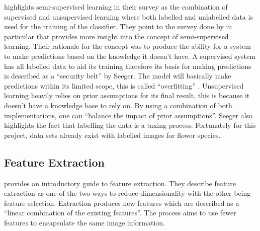 \documentclass[12pt,a4paper]{report}
\begin{document}
\par

\citet{zhu2005semi} highlights semi-supervised learning in their survey as the combination of supervised and
unsupervised 
learning where both labelled and unlabelled data is used for the training of the classifier. They point to the survey done by
\citet{seeger2000learning} in particular that provides more insight into the concept of semi-supervised 
learning. Their rationale for the concept was to produce the ability for a system to make predictions based on 
the knowledge it doesn't have. A supervised system has all labelled data to aid its training therefore its basis for making
predictions is described as a “security belt” by Seeger. The model will basically make predictions within its limited 
scope, this is called “overfitting” \citep{tom1995}. Unsupervised learning heavily relies on prior assumptions for 
its final result, this is because it doesn't have a knowledge base to rely on. By using a combination of both 
implementations, one can “balance the impact of prior assumptions”. Seeger also highlights the fact that labelling the 
data is a taxing process. Fortunately for this project, data sets already exist with labelled images for 
flower species.

\subsection{Feature Extraction}

\citet{dishaa2021} provides an introductory guide to feature extraction. They describe feature extraction 
as one of the two ways to reduce dimensionality with the other being feature selection. Extraction produces new 
features which are described as a “linear combination of the existing features”. The process aims to use fewer features to 
encapsulate the same image information.

\par
\end{document}
